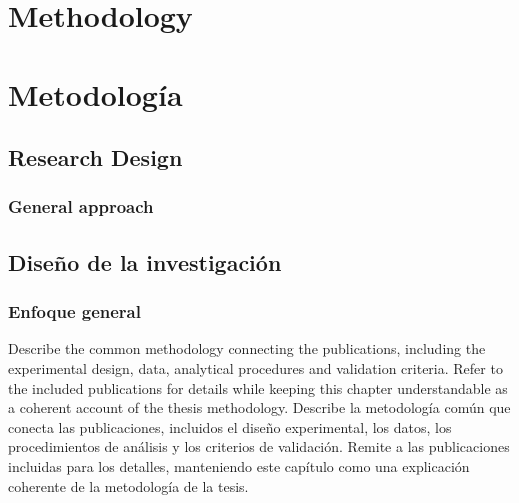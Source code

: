 %

{
  \chapter{Methodology}
}
{
  \chapter{Metodología}
}
\label{cha:compendium-methodology}

{
  \section{Research Design}
  \subsection{General approach}
}
{
  \section{Diseño de la investigación}
  \subsection{Enfoque general}
}

{
  Describe the common methodology connecting the publications, including the experimental design, data, analytical procedures and validation criteria. Refer to the included publications for details while keeping this chapter understandable as a coherent account of the thesis methodology.
}
{
  Describe la metodología común que conecta las publicaciones, incluidos el diseño experimental, los datos, los procedimientos de análisis y los criterios de validación. Remite a las publicaciones incluidas para los detalles, manteniendo este capítulo como una explicación coherente de la metodología de la tesis.
}

